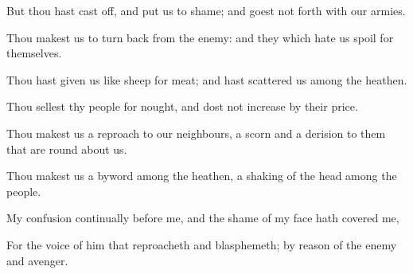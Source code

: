 {\Q {}But thou hast cast
off, and put us to
shame; and goest not
forth with our
armies.


\par }{\Q {}Thou makest us to
turn
back from the
enemy: and they which
hate us
spoil for themselves.


\par }{\Q {}Thou hast
given us like
sheep
{} for
meat; and hast
scattered us among the
heathen.


\par }{\Q {}Thou
sellest thy
people for
nought, and dost not
increase
{} by their
price.


\par }{\Q {}Thou
makest us a
reproach to our
neighbours, a
scorn and a
derision to them that are round
about us.


\par }{\Q {}Thou
makest us a
byword among the
heathen, a
shaking of the
head among the
people.


\par }{\Q {}My
confusion
{}
continually before me, and the
shame of my
face hath
covered me,


\par }{\Q {}For the
voice of him that
reproacheth and
blasphemeth; by
reason of the
enemy and
avenger.


\par }{\BB \par }
